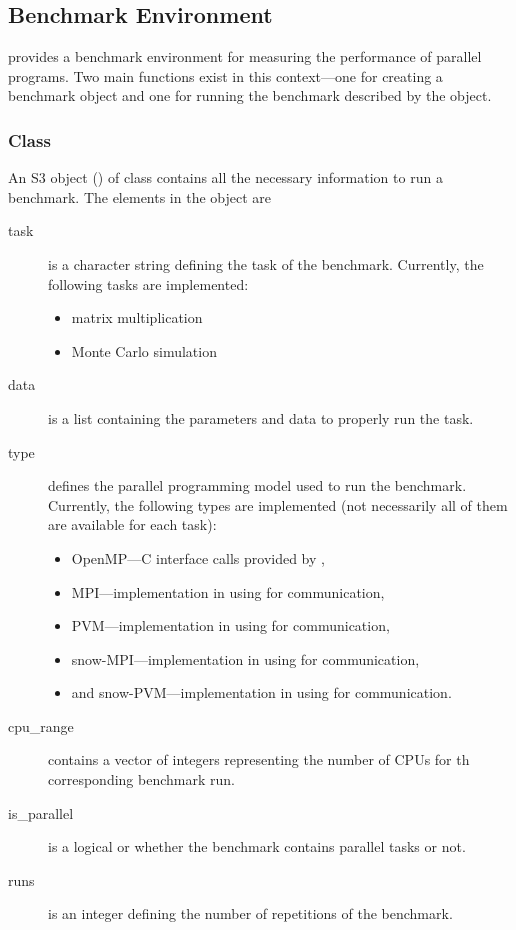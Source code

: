 \subsection{Benchmark Environment}

 provides a benchmark environment for measuring the
performance of parallel programs. Two main functions exist in this
context---one for creating a benchmark object and one for running the
benchmark described by the object.

\subsubsection{Class }

An S3 object (\cite{chambers91sms}) of class  contains all
the necessary information to run a benchmark. The elements in the
object are

\begin{description}
\item[task] is a character string defining the task of the
  benchmark. Currently, the 
  following tasks are implemented:
  \begin{itemize}
  \item matrix multiplication
  \item Monte Carlo simulation
  \end{itemize}
\item[data] is a list containing the parameters and data to properly
  run the task.
\item[type]defines the parallel programming model used to run the
  benchmark. Currently, the following types are implemented (not
  necessarily all of them are available for each task):
  \begin{itemize}
  \item OpenMP---C interface calls provided by ,
  \item MPI---implementation in  using  for
    communication,
  \item PVM---implementation in  using  for
    communication,
  \item snow-MPI---implementation in  using  for
    communication,
  \item and snow-PVM---implementation in  using  for
    communication.
  \end{itemize}
\item[cpu\_range] contains a vector of integers representing the number
  of CPUs for th corresponding benchmark run.
\item[is\_parallel] is a logical  or  whether
  the benchmark
  contains parallel tasks or not.
\item[runs] is an integer defining the number of repetitions of the
  benchmark.
\end{description}

